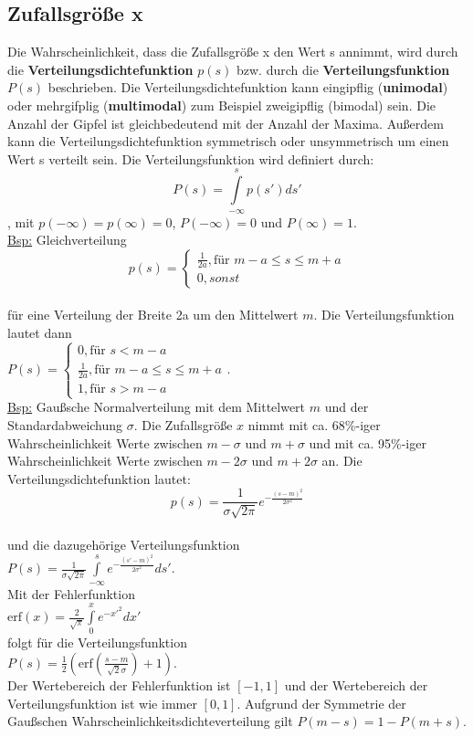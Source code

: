 \subsection{Zufallsgröße x}
Die Wahrscheinlichkeit, dass die Zufallsgröße x den Wert s annimmt, wird durch die {\bf Verteilungsdichtefunktion} $p(s)$ bzw. durch die {\bf Verteilungsfunktion} $P(s)$ beschrieben. Die Verteilungsdichtefunktion kann eingipflig ({\bf unimodal}) oder mehrgifplig ({\bf multimodal}) zum Beispiel zweigipflig (bimodal) sein. Die Anzahl der Gipfel ist gleichbedeutend mit der Anzahl der Maxima. Außerdem kann die Verteilungsdichtefunktion symmetrisch oder unsymmetrisch um einen Wert s verteilt sein. Die Verteilungsfunktion wird definiert durch:\\\begin{equation} P(s)=\int\limits_{-\infty}^s p(s')ds'\end{equation} , mit $p(-\infty)=p(\infty)=0$, $P(-\infty)=0$ und $P(\infty)=1$.\\
\underline {Bsp:} Gleichverteilung\\
\begin{equation}p(s)=\begin{cases}
  \frac{1}{2a},\text{für    }     m-a\leq s\leq m+a\\
 0, sonst 
\end{cases}\end{equation} \\für eine Verteilung der Breite 2a um den Mittelwert $m$. Die Verteilungsfunktion lautet dann \\ 
$P(s)=\begin{cases}
0,\text{für    } s<m-a\\
\frac{1}{2a},\text{für    }     m-a\leq s\leq m+a\\
1,\text{für    } s>m-a
\end{cases}$.
\\ \underline {Bsp:} Gaußsche Normalverteilung mit dem Mittelwert $m$ und der Standardabweichung $\sigma$. Die Zufallsgröße $x$ nimmt mit ca. 68\%-iger Wahrscheinlichkeit Werte zwischen $m-\sigma$ und $m+\sigma$ und mit ca. 95\%-iger Wahrscheinlichkeit Werte zwischen $m-2\sigma$ und $m+2\sigma$ an. Die Verteilungsdichtefunktion lautet:\\
\begin{equation}p(s)=\frac{1}{\sigma \sqrt{2\pi}}e^{-\frac{(s-m)^2}{2\sigma^2}}\end{equation} \\
und die dazugehörige Verteilungsfunktion\\  
$P(s)=\frac{1}{\sigma \sqrt{2\pi}}\int\limits_{-\infty}^s e^{{-\frac{(s'-m)^2}{2\sigma^2}}}ds'$.\\
Mit der Fehlerfunktion\\
$\mbox{erf}(x)=\frac{2}{\sqrt{\pi}}\int\limits_0^x e^{-x'^2}dx'$\\
folgt für die Verteilungsfunktion\\
$P(s) = \frac{1}{2}(\mbox{erf}(\frac{s-m}{\sqrt{2} \sigma}) + 1).$\\
Der Wertebereich der Fehlerfunktion ist $[-1,1]$ und der Wertebereich der Verteilungsfunktion ist wie immer $[0,1]$. Aufgrund der Symmetrie der Gaußschen Wahrscheinlichkeitsdichteverteilung gilt $P(m-s) = 1- P(m+s)$.


